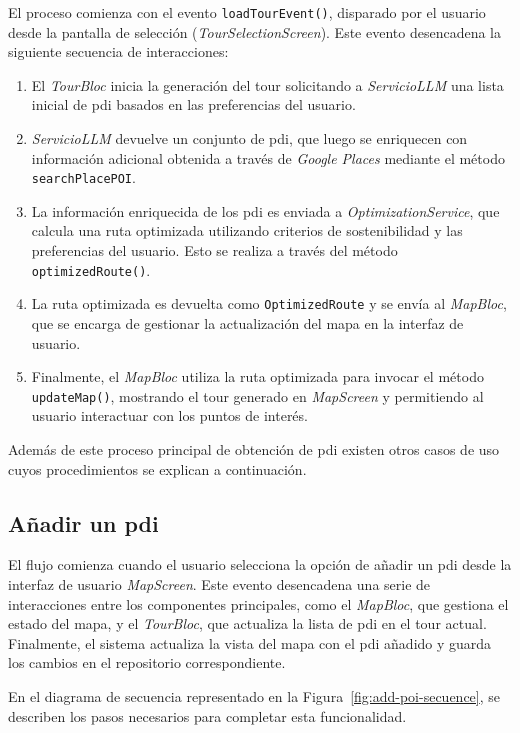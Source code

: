 El proceso comienza con el evento \texttt{loadTourEvent()}, disparado por el usuario desde la pantalla de selección (\textit{TourSelectionScreen}). Este evento desencadena la siguiente secuencia de interacciones:
\begin{enumerate}
	\item El \textit{TourBloc} inicia la generación del tour solicitando a \textit{ServicioLLM} una lista inicial de \acrlong{pdi} basados en las preferencias del usuario.
	\item \textit{ServicioLLM} devuelve un conjunto de \acrlong{pdi}, que luego se enriquecen con información adicional obtenida a través de \textit{Google Places} mediante el método \texttt{searchPlacePOI}.
	\item La información enriquecida de los \acrlong{pdi} es enviada a \textit{OptimizationService}, que calcula una ruta optimizada utilizando criterios de sostenibilidad y las preferencias del usuario. Esto se realiza a través del método \texttt{optimizedRoute()}.
	\item La ruta optimizada es devuelta como \texttt{OptimizedRoute} y se envía al \textit{MapBloc}, que se encarga de gestionar la actualización del mapa en la interfaz de usuario.
	\item Finalmente, el \textit{MapBloc} utiliza la ruta optimizada para invocar el método \texttt{updateMap()}, mostrando el tour generado en \textit{MapScreen} y permitiendo al usuario interactuar con los puntos de interés.
\end{enumerate}
Además de este proceso principal de obtención de \acrlong{pdi} existen otros casos de uso cuyos procedimientos se explican a continuación.
\subsection{Añadir un \acrfull{pdi}}

El flujo comienza cuando el usuario selecciona la opción de añadir un \acrshort{pdi} desde la interfaz de usuario \textit{MapScreen}. Este evento desencadena una serie de interacciones entre los componentes principales, como el \textit{MapBloc}, que gestiona el estado del mapa, y el \textit{TourBloc}, que actualiza la lista de \acrshort{pdi} en el tour actual. Finalmente, el sistema actualiza la vista del mapa con el \acrshort{pdi} añadido y guarda los cambios en el repositorio correspondiente.

En el diagrama de secuencia representado en la Figura~\ref{fig:add-poi-secuence}, se describen los pasos necesarios para completar esta funcionalidad.

